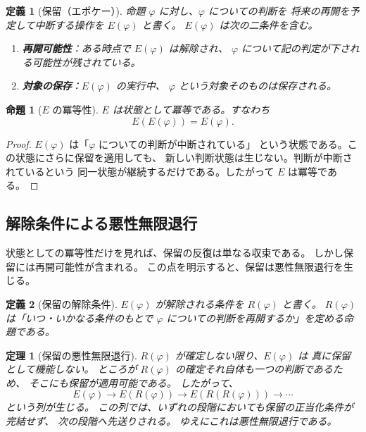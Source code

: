 \documentclass[11pt,a4paper,ja=standard,lualatex]{bxjsarticle}
\newtheorem{theorem}{定理}
\newtheorem{definition}{定義}
\newtheorem{proposition}{命題}
\begin{document}
\begin{definition}[保留（エポケー）]
命題 $\varphi$ に対し、$\varphi$ についての判断を
将来の再開を予定して中断する操作を $E(\varphi)$ と書く。
$E(\varphi)$ は次の二条件を含む。

\begin{enumerate}
\item \textbf{再開可能性}：ある時点で $E(\varphi)$ は解除され、
  $\varphi$ について記の判定が下される可能性が残されている。
\item \textbf{対象の保存}：$E(\varphi)$ の実行中、
  $\varphi$ という対象そのものは保存される。
\end{enumerate}
\end{definition}

\begin{proposition}[$E$ の冪等性]
$E$ は状態として冪等である。すなわち
\begin{equation}
E(E(\varphi))=E(\varphi).
\end{equation}
\end{proposition}

\begin{proof}
$E(\varphi)$ は「$\varphi$ についての判断が中断されている」
という状態である。この状態にさらに保留を適用しても、
新しい判断状態は生じない。判断が中断されているという
同一状態が継続するだけである。したがって $E$ は冪等である。
\end{proof}

\subsection{解除条件による悪性無限退行}

状態としての冪等性だけを見れば、保留の反復は単なる収束である。
しかし保留には再開可能性が含まれる。
この点を明示すると、保留は悪性無限退行を生じる。

\begin{definition}[保留の解除条件]
$E(\varphi)$ が解除される条件を $R(\varphi)$ と書く。
$R(\varphi)$ は「いつ・いかなる条件のもとで
$\varphi$ についての判断を再開するか」を定める命題である。
\end{definition}

\begin{theorem}[保留の悪性無限退行]
$R(\varphi)$ が確定しない限り、$E(\varphi)$ は
真に保留として機能しない。
ところが $R(\varphi)$ の確定それ自体も一つの判断であるため、
そこにも保留が適用可能である。
したがって、
\begin{equation}
E(\varphi)\longrightarrow E(R(\varphi))
\longrightarrow E(R(R(\varphi)))
\longrightarrow\cdots
\end{equation}
という列が生じる。
この列では、いずれの段階においても保留の正当化条件が完結せず、
次の段階へ先送りされる。
ゆえにこれは悪性無限退行である。
\end{theorem}
\end{document}
